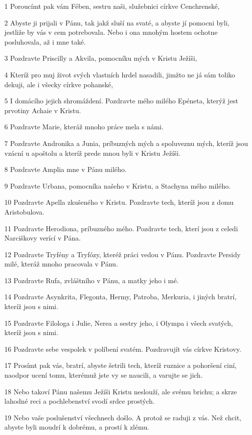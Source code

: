 \par 1 Poroucímt pak vám Fében, sestru naši, služebnici církve Cenchrenské,
\par 2 Abyste ji prijali v Pánu, tak jakž sluší na svaté, a abyste jí pomocni byli, jestliže by vás v cem potrebovala. Nebo i ona mnohým hostem ochotne posluhovala, až i mne také.
\par 3 Pozdravte Priscilly a Akvila, pomocníku mých v Kristu Ježíši,
\par 4 Kteríž pro muj život svých vlastních hrdel nasadili, jimžto ne já sám toliko dekuji, ale i všecky církve pohanské,
\par 5 I domácího jejich shromáždení. Pozdravte mého milého Epéneta, kterýž jest prvotiny Achaie v Kristu.
\par 6 Pozdravte Marie, kteráž mnoho práce mela s námi.
\par 7 Pozdravte Andronika a Junia, príbuzných mých a spoluveznu mých, kteríž jsou vzácní u apoštolu a kteríž prede mnou byli v Kristu Ježíši.
\par 8 Pozdravte Amplia mne v Pánu milého.
\par 9 Pozdravte Urbana, pomocníka našeho v Kristu, a Stachyna mého milého.
\par 10 Pozdravte Apella zkušeného v Kristu. Pozdravte tech, kteríž jsou z domu Aristobulova.
\par 11 Pozdravte Herodiona, príbuzného mého. Pozdravte tech, kterí jsou z celedi Narciškovy verící v Pána.
\par 12 Pozdravte Tryfény a Tryfózy, kteréž práci vedou v Pánu. Pozdravte Persidy milé, kteráž mnoho pracovala v Pánu.
\par 13 Pozdravte Rufa, zvláštního v Pánu, a matky jeho i mé.
\par 14 Pozdravte Asynkrita, Flegonta, Hermy, Patroba, Merkuria, i jiných bratrí, kteríž jsou s nimi.
\par 15 Pozdravte Filologa i Julie, Nerea a sestry jeho, i Olympa i všech svatých, kteríž jsou s nimi.
\par 16 Pozdravte sebe vespolek v políbení svatém. Pozdravujít vás církve Kristovy.
\par 17 Prosímt pak vás, bratrí, abyste šetrili tech, kteríž ruznice a pohoršení ciní, naodpor ucení tomu, kterémuž jste vy se naucili, a varujte se jich.
\par 18 Nebo takoví Pánu našemu Ježíši Kristu neslouží, ale svému brichu; a skrze lahodné reci a pochlebenství svodí srdce prostých.
\par 19 Nebo vaše poslušenství všechnech došlo. A protož se raduji z vás. Než chcit, abyste byli moudrí k dobrému, a prostí k zlému.
